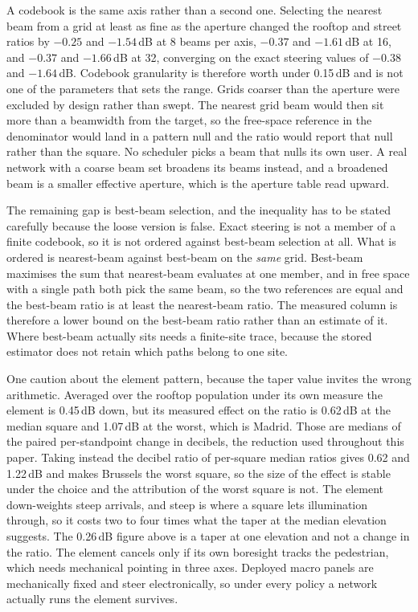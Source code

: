 \documentclass[journal]{IEEEtran}
\begin{document}
A codebook is the same axis rather than a second one. Selecting the nearest beam
from a grid at least as fine as the aperture changed the rooftop and street
ratios by $-0.25$ and $-1.54$\,dB at 8 beams per axis, $-0.37$ and $-1.61$\,dB at
16, and $-0.37$ and $-1.66$\,dB at 32, converging on the exact steering values of
$-0.38$ and $-1.64$\,dB. Codebook granularity is therefore worth under 0.15\,dB
and is not one of the parameters that sets the range. Grids coarser than the
aperture were excluded by design rather than swept. The nearest grid beam would
then sit more than a beamwidth from the target, so the free-space reference in
the denominator would land in a pattern null and the ratio would report that null
rather than the square. No scheduler picks a beam that nulls its own user.
A real network with a coarse beam set broadens its beams instead, and a broadened
beam is a smaller effective aperture, which is the aperture table read upward.

The remaining gap is best-beam selection, and the inequality has to be stated
carefully because the loose version is false. Exact steering is not a member of a
finite codebook, so it is not ordered against best-beam selection at all. What is
ordered is nearest-beam against best-beam on the \emph{same} grid. Best-beam
maximises the sum that nearest-beam evaluates at one member, and in free space
with a single path both pick the same beam, so the two references are equal and
the best-beam ratio is at least the nearest-beam ratio. The measured column is
therefore a lower bound on the best-beam ratio rather than an estimate of it.
Where best-beam actually sits needs a finite-site trace, because the stored
estimator does not retain which paths belong to one site.

One caution about the element pattern, because the taper value invites the wrong
arithmetic. Averaged over the rooftop population under its own measure the
element is 0.45\,dB down, but its measured effect on the ratio is 0.62\,dB at the
median square and 1.07\,dB at the worst, which is Madrid. Those are medians of
the paired per-standpoint change in decibels, the reduction used throughout this
paper. Taking instead the decibel ratio of per-square median ratios gives 0.62
and 1.22\,dB and makes Brussels the worst square, so the size of the effect is
stable under the choice and the attribution of the worst square is not. The
element down-weights steep arrivals,
and steep is where a square lets illumination through, so it costs two to four
times what the taper at the median elevation suggests. The 0.26\,dB figure above
is a taper at one elevation and not a change in the ratio. The element cancels
only if its own boresight tracks the pedestrian, which needs mechanical pointing
in three axes. Deployed macro panels are mechanically fixed and steer
electronically, so under every policy a network actually runs the element
survives.
\end{document}
